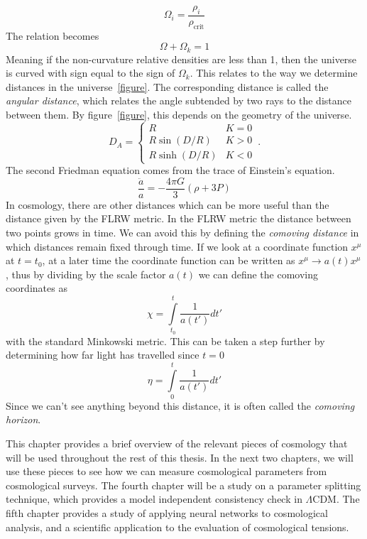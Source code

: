 \begin{equation}
    \Omega_i = \frac{\rho_i}{\rho_\mathrm{crit}}
\end{equation}
The relation becomes
\begin{equation}
    \Omega + \Omega_k = 1 
\end{equation}
Meaning if the non-curvature relative densities are less than 1, then the universe is curved with sign equal to the sign of $\Omega_k$. This relates to the way we determine distances in the universe~\ref{figure}. The corresponding distance is called the \textit{angular distance}, which relates the angle subtended by two rays to the distance between them. By figure~\ref{figure}, this depends on the geometry of the universe.
\begin{equation}
    D_A = \left\{ \begin{array}{cc}
        R & K=0 \\
        R\sin(D/R) & K>0 \\
        R\sinh(D/R) & K<0
    \end{array}
    \right.\,.
\end{equation}
The second Friedman equation comes from the trace of Einstein's equation.
\begin{equation}
    \frac{\ddot a}{a} = -\frac{4\pi G}{3}(\rho + 3P)
\end{equation}
In cosmology, there are other distances which can be more useful than the distance given by the FLRW metric. In the FLRW metric the distance between two points grows in time. 
We can avoid this by defining the \textit{comoving distance} in which distances remain fixed through time. 
If we look at a coordinate function $x^\mu$ at $t=t_0$, at a later time the coordinate function can be written as $x^\mu \rightarrow a(t) x^\mu$, thus by dividing by the scale factor $a(t)$ we can define the comoving coordinates as
\begin{equation}
    \chi = \int\limits^{t}_{t_0} \frac{1}{a(t')} dt'
\end{equation}
with the standard Minkowski metric. This can be taken a step further by determining how far light has travelled since $t=0$
\begin{equation}
    \eta = \int\limits^t_0 \frac{1}{a(t')}dt'
\end{equation}
Since we can't see anything beyond this distance, it is often called the \textit{comoving horizon}. 

This chapter provides a brief overview of the relevant pieces of cosmology that will be used throughout the rest of this thesis. In the next two chapters, we will use these pieces to see how we can measure cosmological parameters from cosmological surveys. The fourth chapter will be a study on a parameter splitting technique, which provides a model independent consistency check in $\Lambda$CDM. The fifth chapter provides a study of applying neural networks to cosmological analysis, and a scientific application to the evaluation of cosmological tensions.

